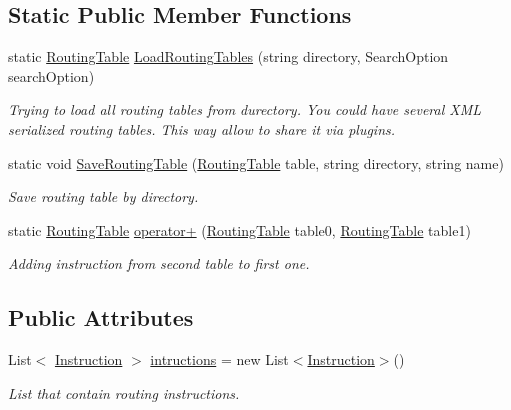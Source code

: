 \subsection*{Static Public Member Functions}
\begin{DoxyCompactItemize}
\item 
static \mbox{\hyperlink{class_pipes_provider_1_1_networking_1_1_routing_1_1_routing_table}{Routing\+Table}} \mbox{\hyperlink{class_pipes_provider_1_1_networking_1_1_routing_1_1_routing_table_a13c2778abb1d14e7e8e4a2ae51d315ac}{Load\+Routing\+Tables}} (string directory, Search\+Option search\+Option)
\begin{DoxyCompactList}\small\item\em Trying to load all routing tables from durectory. You could have several X\+ML serialized routing tables. This way allow to share it via plugins. \end{DoxyCompactList}\item 
static void \mbox{\hyperlink{class_pipes_provider_1_1_networking_1_1_routing_1_1_routing_table_a1fe9c42819cd5c5210b254c0d868b336}{Save\+Routing\+Table}} (\mbox{\hyperlink{class_pipes_provider_1_1_networking_1_1_routing_1_1_routing_table}{Routing\+Table}} table, string directory, string name)
\begin{DoxyCompactList}\small\item\em Save routing table by directory. \end{DoxyCompactList}\item 
static \mbox{\hyperlink{class_pipes_provider_1_1_networking_1_1_routing_1_1_routing_table}{Routing\+Table}} \mbox{\hyperlink{class_pipes_provider_1_1_networking_1_1_routing_1_1_routing_table_a515b9ad19dc868afb6d47c762064fd96}{operator+}} (\mbox{\hyperlink{class_pipes_provider_1_1_networking_1_1_routing_1_1_routing_table}{Routing\+Table}} table0, \mbox{\hyperlink{class_pipes_provider_1_1_networking_1_1_routing_1_1_routing_table}{Routing\+Table}} table1)
\begin{DoxyCompactList}\small\item\em Adding instruction from second table to first one. \end{DoxyCompactList}\end{DoxyCompactItemize}
\subsection*{Public Attributes}
\begin{DoxyCompactItemize}
\item 
List$<$ \mbox{\hyperlink{class_pipes_provider_1_1_networking_1_1_routing_1_1_instruction}{Instruction}} $>$ \mbox{\hyperlink{class_pipes_provider_1_1_networking_1_1_routing_1_1_routing_table_a1a2c8459b4805d7ee1e81698a389f3f7}{intructions}} = new List$<$\mbox{\hyperlink{class_pipes_provider_1_1_networking_1_1_routing_1_1_instruction}{Instruction}}$>$()
\begin{DoxyCompactList}\small\item\em List that contain routing instructions. \end{DoxyCompactList}\end{DoxyCompactItemize}
